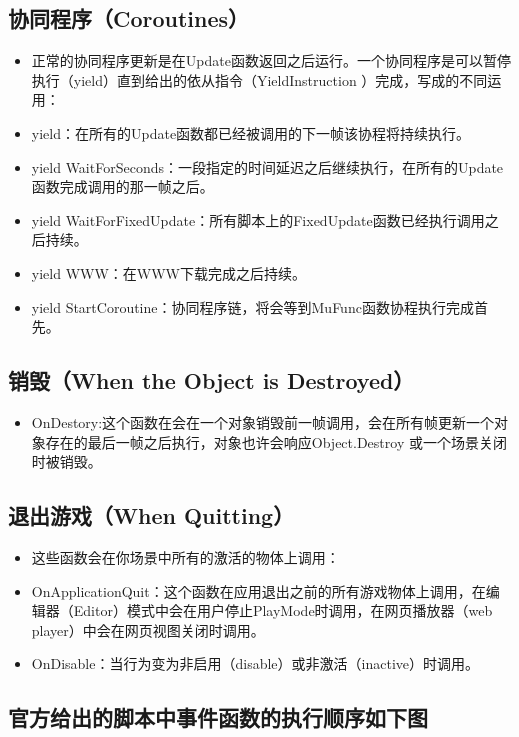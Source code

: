 \documentclass[9pt, b5paper]{article}
\begin{document}
\subsection{协同程序（Coroutines）}
\label{sec:org7866f59}
\begin{itemize}
\item 正常的协同程序更新是在Update函数返回之后运行。一个协同程序是可以暂停执行（yield）直到给出的依从指令（YieldInstruction ）完成，写成的不同运用：
\item yield：在所有的Update函数都已经被调用的下一帧该协程将持续执行。
\item yield WaitForSeconds：一段指定的时间延迟之后继续执行，在所有的Update函数完成调用的那一帧之后。
\item yield WaitForFixedUpdate：所有脚本上的FixedUpdate函数已经执行调用之后持续。
\item yield WWW：在WWW下载完成之后持续。
\item yield StartCoroutine：协同程序链，将会等到MuFunc函数协程执行完成首先。
\end{itemize}
\subsection{销毁（When the Object is Destroyed）}
\label{sec:orgba0df95}
\begin{itemize}
\item OnDestory:这个函数在会在一个对象销毁前一帧调用，会在所有帧更新一个对象存在的最后一帧之后执行，对象也许会响应Object.Destroy 或一个场景关闭时被销毁。
\end{itemize}
\subsection{退出游戏（When Quitting）}
\label{sec:org157ec30}
\begin{itemize}
\item 这些函数会在你场景中所有的激活的物体上调用：
\item OnApplicationQuit：这个函数在应用退出之前的所有游戏物体上调用，在编辑器（Editor）模式中会在用户停止PlayMode时调用，在网页播放器（web player）中会在网页视图关闭时调用。
\item OnDisable：当行为变为非启用（disable）或非激活（inactive）时调用。
\end{itemize}
\subsection{官方给出的脚本中事件函数的执行顺序如下图}
\label{sec:org7bb1578}
\end{document}
